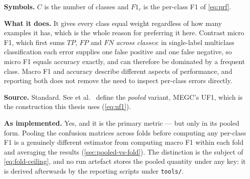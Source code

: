 \textbf{Symbols.} $C$ is the number of classes and $F1_c$ is the per-class F1
of \autoref{eq:prf}.

\textbf{What it does.} It gives every class equal weight regardless of how
many examples it has, which is the whole reason for preferring it here.
Contrast micro F1, which first sums $TP$, $FP$ and $FN$ \emph{across classes}:
in single-label multiclass classification each error supplies one false
positive and one false negative, so micro F1 equals accuracy exactly, and can
therefore be dominated by a frequent class. Macro F1 and accuracy describe
different aspects of performance, and reporting both does not remove the need
to inspect per-class errors directly.

\textbf{Source.} Standard. See et al.~\cite{see2019} define the \emph{pooled}
variant, MEGC's UF1, which is the construction this thesis uses
(\autoref{eq:uf1}).

\textbf{As implemented.} Yes, and it is the primary metric --- but only in
its pooled form. Pooling the confusion matrices across folds before computing
any per-class F1 is a genuinely different estimator from computing macro F1
within each fold and averaging the results (\autoref{sec:pooled-vs-fold}). The
distinction is the subject of \autoref{eq:fold-ceiling}, and no run artefact
stores the pooled quantity under any key: it is derived afterwards by the
reporting scripts under \texttt{tools/}.
